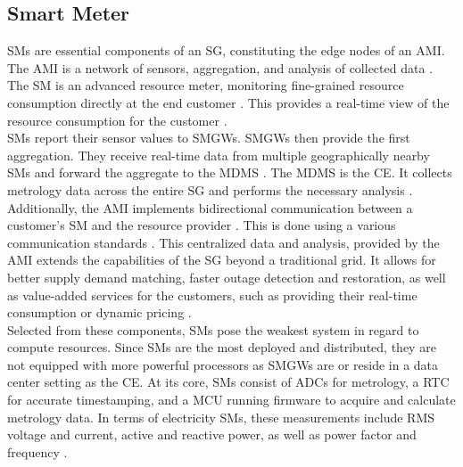\documentclass[english]{tudscrartcl}
\begin{document}
		\subsection{Smart Meter}
			\label{sec:bg_sm}
			\acp{SM} are essential components of an SG, constituting the edge nodes of an \ac{AMI}.
			The \ac{AMI} is a network of sensors, aggregation, and analysis of collected data \cite{7379940}.
			The \ac{SM} is an advanced resource meter, monitoring fine-grained resource consumption directly at the end customer \cite{6520030}.
			This provides a real-time view of the resource consumption for the customer \cite{6520030}.
			\\
			\acp{SM} report their sensor values to \acp{SMGW}.
			\acp{SMGW} then provide the first aggregation.
			They receive real-time data from multiple geographically nearby \acp{SM} and forward the aggregate to the \ac{MDMS} \cite{7379940}.
			The \ac{MDMS} is the \ac{CE}.
			It collects metrology data across the entire \ac{SG} and performs the necessary analysis \cite{7379940}.
			Additionally, the \ac{AMI} implements bidirectional communication between a customer's \ac{SM} and the resource provider \cite{7379940}.
			This is done using a various communication standards \cite{6520030, en15196984}.
			This centralized data and analysis, provided by the AMI extends the capabilities of the \ac{SG} beyond a traditional grid.
			It allows for better supply demand matching, faster outage detection and restoration, as well as value-added services for the customers, such as providing their real-time consumption or dynamic pricing \cite{7379940}.
			\\
			Selected from these components, \acp{SM} pose the weakest system in regard to compute resources.
			Since \acp{SM} are the most deployed and distributed, they are not equipped with more powerful processors as \acp{SMGW} are or reside in a data center setting as the \ac{CE}.
			At its core, \acp{SM} consist of \acp{ADC} for metrology, a \ac{RTC} for accurate timestamping, and a \ac{MCU} running firmware to acquire and calculate metrology data.
			In terms of electricity \acp{SM}, these measurements include \ac{RMS} voltage and current, active and reactive power, as well as power factor and frequency \cite{7379940}.
			\\
\end{document}
